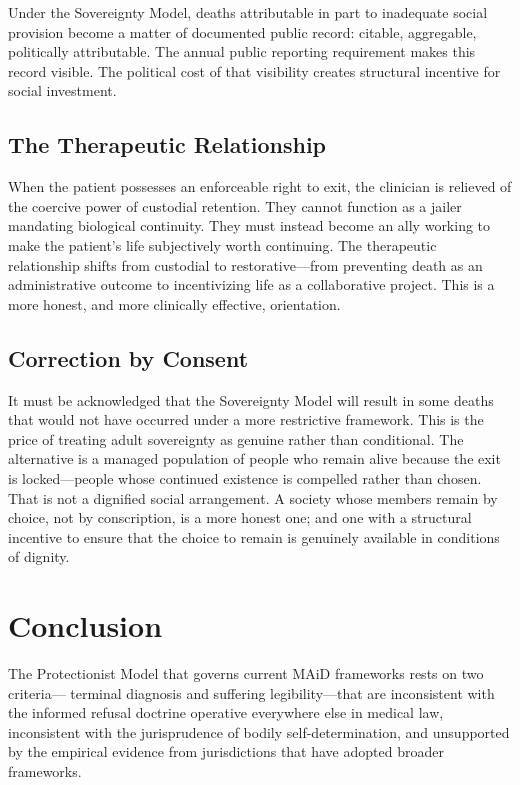 \documentclass[11pt, letterpaper]{article}
\begin{document}
Under the Sovereignty Model, deaths attributable in part to inadequate social
provision become a matter of documented public record: citable, aggregable,
politically attributable. The annual public reporting requirement makes this record
visible. The political cost of that visibility creates structural incentive for
social investment.

\subsection{The Therapeutic Relationship}

When the patient possesses an enforceable right to exit, the clinician is
relieved of the coercive power of custodial retention. They cannot function as a
jailer mandating biological continuity. They must instead become an ally working
to make the patient's life subjectively worth continuing. The therapeutic
relationship shifts from custodial to restorative---from preventing death as
an administrative outcome to incentivizing life as a collaborative project. This
is a more honest, and more clinically effective, orientation.

\subsection{Correction by Consent}

It must be acknowledged that the Sovereignty Model will result in some deaths that
would not have occurred under a more restrictive framework. This is the price of
treating adult sovereignty as genuine rather than conditional. The alternative is
a managed population of people who remain alive because the exit is locked---people
whose continued existence is compelled rather than chosen. That is not a dignified
social arrangement. A society whose members remain by choice, not by conscription,
is a more honest one; and one with a structural incentive to ensure that the choice
to remain is genuinely available in conditions of dignity.

\section{Conclusion}

The Protectionist Model that governs current MAiD frameworks rests on two criteria---
terminal diagnosis and suffering legibility---that are inconsistent with the informed
refusal doctrine operative everywhere else in medical law, inconsistent with the
jurisprudence of bodily self-determination, and unsupported by the empirical evidence
from jurisdictions that have adopted broader frameworks.
\end{document}
